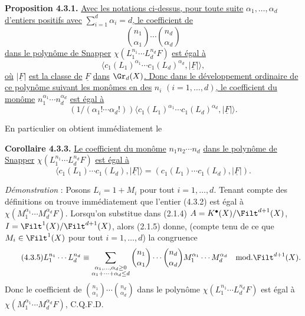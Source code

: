 
\textbf{Proposition 4.3.1.} \uline{Avec les notations ci-dessus, pour toute suite} \(\alpha_1,\ldots,\alpha_d\) \uline{d'entiers positifs avec} \(\sum_{i=1}^{d}\alpha_i=d\)\uline{, le coefficient de}
\[
 \binom{n_1}{\alpha_1}\cdots\binom{n_d}{\alpha_d}
\]
\uline{dans le polynôme de Snapper} \(\chi(L_1^{n_1}\cdots L_d^{n_d}F)\) \uline{est égal à}
\begin{equation}\tag{4.3.2}
 \bigl\langle c_1(L_1)^{\alpha_1}\cdots c_1(L_d)^{\alpha_d},\lvert\underline{F}\rvert\bigr\rangle,
\end{equation}
\uline{où} \(\lvert\underline{F}\rvert\) \uline{est la classe de} \(\underline{F}\) \uline{dans} \(\Gr_d(X)\)\uline{. Donc dans le développement ordinaire de ce polynôme suivant les monômes en des} \(n_i\) \((i=1,\ldots,d)\)\uline{, le coefficient du monôme} \(n_1^{\alpha_1}\cdots n_d^{\alpha_d}\) \uline{est égal à}
\[
 (1/(\alpha_1! \cdots \alpha_d!))
 \bigl\langle c_1(L_1)^{\alpha_1}\cdots c_1(L_d)^{\alpha_d},\lvert\underline{F}\rvert\bigr\rangle.
\]

En particulier on obtient immédiatement le

\textbf{Corollaire 4.3.3.} \uline{Le coefficient du monôme} \(n_1n_2\cdots n_d\) \uline{dans le polynôme de Snapper} \(\chi(L_1^{n_1}\cdots L_d^{n_d}F)\) \uline{est égal à}
\begin{equation}\tag{4.3.4}
 \bigl\langle c_1(L_1)\cdots c_1(L_d),\lvert\underline{F}\rvert\bigr\rangle
 =
 (c_1(L_1)\cdots c_1(L_d),\lvert\underline{F}\rvert).
\end{equation}

\emph{Démonstration} : Posons \(L_i=1+M_i\) pour tout \(i=1,\ldots,d\). Tenant compte des définitions on trouve immédiatement que l'entier (4.3.2) est égal à \(\chi(M_1^{\alpha_1}\cdots M_d^{\alpha_d}F)\). Lorsqu'on substitue dans (2.1.4) \(A=K^{\bullet}(X)/\Filt^{d+1}(X)\), \(I=\Filt^1(X)/\Filt^{d+1}(X)\), alors (2.1.5) donne, (compte tenu de ce que \(M_i\in\Filt^1(X)\) pour tout \(i=1,\ldots,d\)) la congruence
\begin{equation}\tag{4.3.5}
 L_1^{n_1}\cdots L_d^{n_d}
 \equiv
 \sum_{\substack{\alpha_1,\ldots,\alpha_d\geq0\\ \alpha_1+\cdots+\alpha_d\leq d}}
 \binom{n_1}{\alpha_1}\cdots\binom{n_d}{\alpha_d}
 M_1^{\alpha_1}\cdots M_d^{\alpha_d}
 \quad\mathrm{mod.}\Filt^{d+1}(X).
\end{equation}
Donc le coefficient de \(\binom{n_1}{\alpha_1}\cdots\binom{n_d}{\alpha_d}\) dans le polynôme \(\chi(L_1^{n_1}\cdots L_d^{n_d}F)\) est égal à \(\chi(M_1^{\alpha_1}\cdots M_d^{\alpha_d}F)\), C.Q.F.D.

